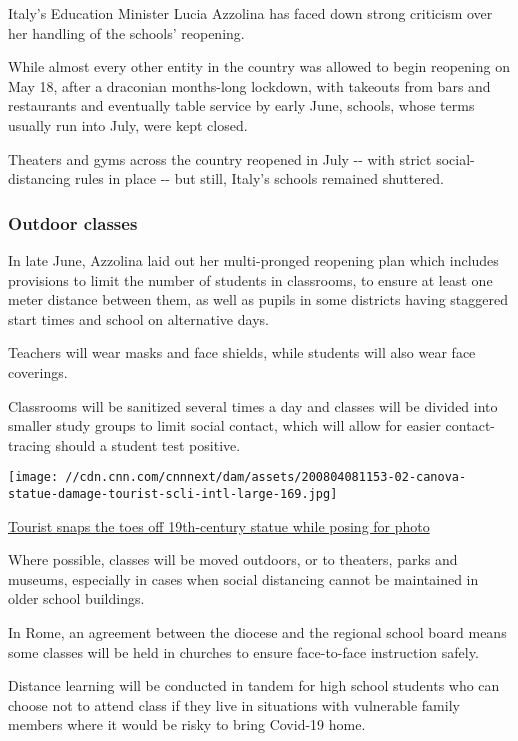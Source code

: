 Italy's Education Minister Lucia Azzolina has faced down strong
criticism over her handling of the schools' reopening.

While almost every other entity in the country was allowed to begin
reopening on May 18, after a draconian months-long lockdown, with
takeouts from bars and restaurants and eventually table service by early
June, schools, whose terms usually run into July, were kept closed.

Theaters and gyms across the country reopened in July -\/- with strict
social-distancing rules in place -\/- but still, Italy's schools
remained shuttered.

\hypertarget{outdoor-classes}{%
\subsubsection{Outdoor classes}\label{outdoor-classes}}

In late June, Azzolina laid out her multi-pronged reopening plan which
includes provisions to limit the number of students in classrooms, to
ensure at least one meter distance between them, as well as pupils in
some districts having staggered start times and school on alternative
days.

Teachers will wear masks and face shields, while students will also wear
face coverings.

Classrooms will be sanitized several times a day and classes will be
divided into smaller study groups to limit social contact, which will
allow for easier contact-tracing should a student test positive.

\href{/style/article/canova-statue-damage-tourist-scli-intl/index.html}{}

\texttt{[image: //cdn.cnn.com/cnnnext/dam/assets/200804081153-02-canova-statue-damage-tourist-scli-intl-large-169.jpg]}

\href{/style/article/canova-statue-damage-tourist-scli-intl/index.html}{Tourist
snaps the toes off 19th-century statue while posing for photo}

Where possible, classes will be moved outdoors, or to theaters, parks
and museums, especially in cases when social distancing cannot be
maintained in older school buildings.

In Rome, an agreement between the diocese and the regional school board
means some classes will be held in churches to ensure face-to-face
instruction safely.

Distance learning will be conducted in tandem for high school students
who can choose not to attend class if they live in situations with
vulnerable family members where it would be risky to bring Covid-19
home.

